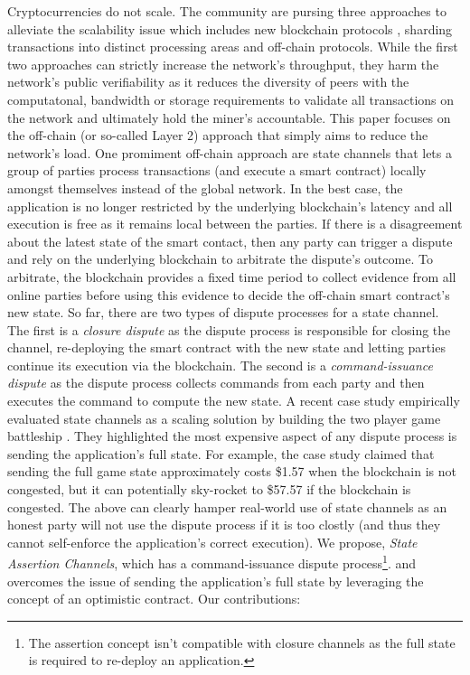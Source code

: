 \documentclass{llncs}
\begin{document}
Cryptocurrencies do not scale.
The community are pursing three approaches to alleviate the scalability issue which includes new blockchain protocols \cite{bano2017consensus}, sharding transactions into distinct processing areas and off-chain protocols. 
While the first two approaches can strictly increase the network's throughput, they harm the network's public verifiability as it reduces  the diversity of peers with the computatonal, bandwidth or storage requirements to validate all transactions on the network and ultimately hold the miner's accountable. 
This paper focuses on the off-chain (or so-called Layer 2) approach that simply aims to reduce the network's load.
One promiment off-chain approach are state channels that lets a group of parties process transactions (and execute a smart contract) locally amongst themselves instead of the global network. 
In the best case, the application is no longer restricted by the underlying blockchain's latency and all execution is free as it remains local between the parties. 
If there is a disagreement about the latest state of the smart contact, then any party can trigger a dispute and rely on the underlying blockchain to arbitrate the dispute's outcome.
To arbitrate, the blockchain provides a fixed time period to collect evidence from all online parties before using this evidence to decide the off-chain smart contract's new state. 
So far, there are two types of dispute processes for a state channel. 
The first is a \emph{closure dispute} \cite{statechannelnetworks,battleship,celernetwork} as the dispute process is responsible for closing the channel, re-deploying the smart contract with the new state and letting parties continue its execution via the blockchain. 
The second is a \emph{command-issuance dispute} \cite{miller2017sprites,mccorry2018pisa,counterfactual} as the dispute process collects commands from each party and then executes the command to compute the new state. 
A recent case study empirically evaluated state channels as a scaling solution by building the  two player game battleship \cite{battleship}.
They highlighted the most expensive aspect of any dispute process is sending the application's full state. 
For example, the  case study claimed that sending the full game state approximately costs \$1.57 when the blockchain is not congested, but it can potentially sky-rocket to \$57.57 if the blockchain is congested. 
The above can clearly hamper real-world use of state channels as an honest party will not use the dispute process if it is too clostly (and thus they cannot self-enforce the application's correct execution). 
We propose, \emph{State Assertion Channels}, which has a command-issuance dispute process\footnote{The assertion concept isn't compatible with closure channels as the full state is required to re-deploy an application.}.  and overcomes the issue of sending the application's full state by leveraging the concept of an optimistic contract.
Our contributions: 
\end{document}
